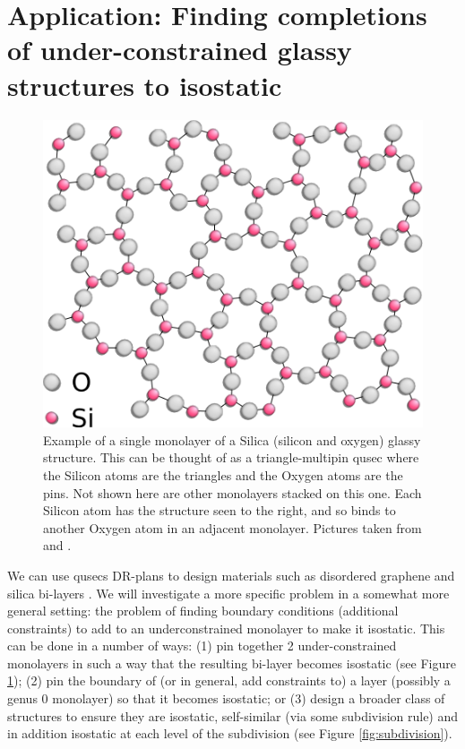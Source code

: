 \section{Application: Finding completions of under-constrained glassy structures to isostatic}
\label{sec:bodypin}
% 


\begin{figure}\centering
    \includegraphics[width=0.4\linewidth]{img/Silica} \hspace{0.5cm}
    \caption{Example of a single monolayer of a Silica (silicon and oxygen)
    glassy structure. This can be thought of as a triangle-multipin qusec
where the Silicon atoms are the triangles and the Oxygen atoms are the pins.
Not shown here are other monolayers stacked on this one. Each Silicon atom
has the structure seen to the right, and so binds to another Oxygen atom in
an adjacent monolayer. Pictures taken from \cite{silica_figure} and \cite{tetra_silica_figure}.}
    \label{fig:silica_glass}
\end{figure}


We can use qusecs DR-plans to design materials such as disordered
graphene and silica bi-layers \cite{silica_bilayers}
\cite{sructure_of_2d_glass}. We will investigate a more specific problem in
a somewhat more general setting:
the problem of finding boundary conditions (additional constraints) to
add to an underconstrained monolayer to make it
isostatic.
This can be done in a number of ways:
(1) pin together 2 under-constrained monolayers in such a way that the resulting bi-layer becomes isostatic (see Figure \ref{fig:silica_glass});
(2) pin the boundary of (or in general, add constraints to) a layer (possibly a genus 0 monolayer) so that it becomes isostatic; or
(3) design a broader class of structures to ensure they are isostatic, self-similar (via some subdivision rule) and in addition isostatic at each level of the subdivision (see Figure \ref{fig:subdivision}).

